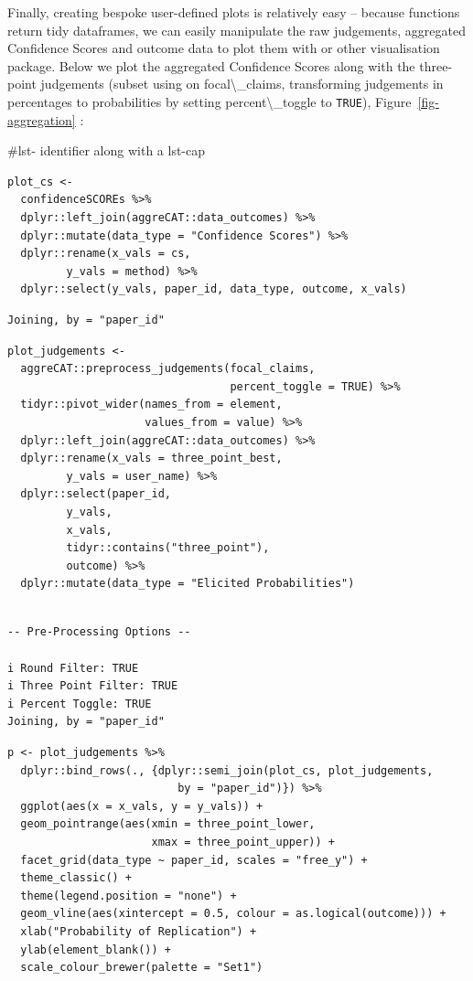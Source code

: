 \documentclass[article]{jss}
\newcommand{\fct}[1]{\code{#1()}}
\begin{document}
Finally, creating bespoke user-defined plots is relatively easy --
because  functions return tidy dataframes, we can easily
manipulate the raw judgements, aggregated Confidence Scores and outcome
data to plot them with  \citep{ggplot2016} or other
visualisation package. Below we plot the aggregated Confidence Scores
along with the three-point judgements (subset using
\fct{preprocess\_judgements} on {focal\textbackslash\_claims},
transforming judgements in percentages to probabilities by setting
{percent\textbackslash\_toggle} to \texttt{TRUE}),
Figure~\ref{fig-aggregation} :

\#lst- identifier along with a lst-cap

\begin{verbatim}
plot_cs <- 
  confidenceSCOREs %>% 
  dplyr::left_join(aggreCAT::data_outcomes) %>% 
  dplyr::mutate(data_type = "Confidence Scores") %>% 
  dplyr::rename(x_vals = cs,
         y_vals = method) %>% 
  dplyr::select(y_vals, paper_id, data_type, outcome, x_vals)
\end{verbatim}

\begin{verbatim}
Joining, by = "paper_id"
\end{verbatim}

\begin{verbatim}
plot_judgements <- 
  aggreCAT::preprocess_judgements(focal_claims,
                                  percent_toggle = TRUE) %>% 
  tidyr::pivot_wider(names_from = element, 
                     values_from = value) %>%
  dplyr::left_join(aggreCAT::data_outcomes) %>% 
  dplyr::rename(x_vals = three_point_best,
         y_vals = user_name) %>% 
  dplyr::select(paper_id, 
         y_vals, 
         x_vals, 
         tidyr::contains("three_point"),
         outcome) %>% 
  dplyr::mutate(data_type = "Elicited Probabilities")
\end{verbatim}

\begin{verbatim}

-- Pre-Processing Options --

i Round Filter: TRUE
i Three Point Filter: TRUE
i Percent Toggle: TRUE
Joining, by = "paper_id"
\end{verbatim}

\begin{verbatim}
p <- plot_judgements %>%  
  dplyr::bind_rows(., {dplyr::semi_join(plot_cs, plot_judgements,
                          by = "paper_id")}) %>% 
  ggplot(aes(x = x_vals, y = y_vals)) +
  geom_pointrange(aes(xmin = three_point_lower, 
                      xmax = three_point_upper)) +
  facet_grid(data_type ~ paper_id, scales = "free_y") + 
  theme_classic() +
  theme(legend.position = "none") +
  geom_vline(aes(xintercept = 0.5, colour = as.logical(outcome))) +
  xlab("Probability of Replication") +
  ylab(element_blank()) +
  scale_colour_brewer(palette = "Set1")
\end{verbatim}
\end{document}
